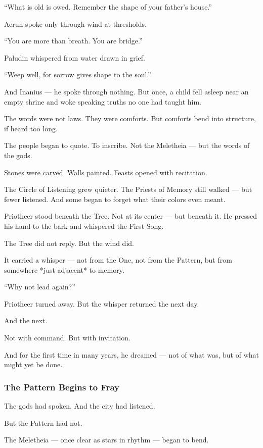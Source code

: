 \documentclass[12pt]{article}
\begin{document}
 “What is old is owed. Remember the shape of your father’s house.”

Aerun spoke only through wind at thresholds.  

 “You are more than breath. You are bridge.”

Paludin whispered from water drawn in grief.

 “Weep well, for sorrow gives shape to the soul.”

And Inanius —  
he spoke through nothing.  
But once, a child fell asleep near an empty shrine and woke speaking truths no one had taught him.

The words were not laws.  
They were comforts.  
But comforts bend into structure, if heard too long.

The people began to quote.  
To inscribe.  
Not the Meletheia — but the words of the gods.

Stones were carved.  
Walls painted.  
Feasts opened with recitation.

The Circle of Listening grew quieter.  
The Priests of Memory still walked —  
but fewer listened.  
And some began to forget what their colors even meant.

Priotheer stood beneath the Tree.  
Not at its center — but beneath it.  
He pressed his hand to the bark and whispered the First Song.

The Tree did not reply.  
But the wind did.

It carried a whisper — not from the One,  
not from the Pattern,  
but from somewhere *just adjacent* to memory.

 “Why not lead again?”

Priotheer turned away.  
But the whisper returned the next day.

And the next.

Not with command.  
But with invitation.

And for the first time in many years,  
he dreamed —  
not of what was,  
but of what might yet be done.

\dotfill

\subsubsection{The Pattern Begins to Fray}

The gods had spoken.  
And the city had listened.

But the Pattern had not.

The Meletheia — once clear as stars in rhythm — began to bend. 
\end{document}
